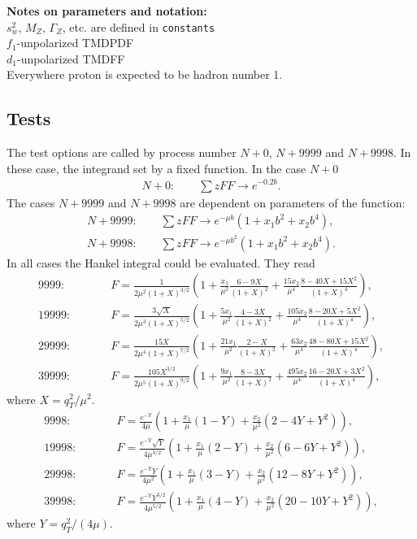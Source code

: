 \documentclass[prd,nofootinbib,eqsecnum,final]{revtex4}
\renewcommand{\(}{\left(}
\renewcommand{\)}{\right)}
\renewcommand{\[}{\left[}
\renewcommand{\]}{\right]}
\begin{document}
\textbf{Notes on parameters and notation:} 
\\
$s_w^2$, $M_Z$, $\Gamma_Z$, etc. are defined in \texttt{constants}
\\
$f_1$-unpolarized TMDPDF
\\
$d_1$-unpolarized TMDFF
\\
Everywhere proton is expected to be hadron number 1.


\subsection{Tests}
\label{TMDF:tests}

The test options are called by process number $N+0$, $N+9999$ and $N+9998$. In these case, the integrand set by a fixed function. In the case $N+0$
\begin{eqnarray}
N+0:\qquad \sum z FF \to e^{-0.2b}.
\end{eqnarray}
The cases $N+9999$ and $N+9998$ are dependent on parameters of the function:
\begin{eqnarray}
N+9999:\qquad \sum z FF \to e^{-\mu b}(1+x_1 b^2+x_2 b^4),
\\
N+9998:\qquad \sum z FF \to e^{-\mu b^2}(1+x_1 b^2+x_2 b^4).
\end{eqnarray}
In all cases the Hankel integral could be evaluated. They read
\begin{eqnarray}
\text{9999}:&\qquad& F=\frac{1}{2\mu^2(1+X)^{3/2}}\(1+\frac{x_1}{\mu^2}\frac{6-9X}{(1+X)^2}+\frac{15x_2}{\mu^4}\frac{8-40X+15 X^2}{(1+X)^4}\),
\\
\text{19999}:&\qquad& F=\frac{3\sqrt{X}}{2\mu^3(1+X)^{5/2}}\(1+\frac{5x_1}{\mu^2}\frac{4-3X}{(1+X)^2}+\frac{105x_2}{\mu^4}\frac{8-20X+5 X^2}{(1+X)^4}\),
\\
\text{29999}:&\qquad& F=\frac{15 X}{2\mu^4(1+X)^{7/2}}\(1+\frac{21x_1}{\mu^2}\frac{2-X}{(1+X)^2}+\frac{63x_2}{\mu^4}\frac{48-80X+15 X^2}{(1+X)^4}\),
\\
\text{39999}:&\qquad& F=\frac{105 X^{3/2}}{2\mu^5(1+X)^{9/2}}\(1+\frac{9x_1}{\mu^2}\frac{8-3X}{(1+X)^2}+\frac{495x_2}{\mu^4}\frac{16-20X+3 X^2}{(1+X)^4}\),
\end{eqnarray}
where $X=q_T^2/\mu^2$.
\begin{eqnarray}
\text{9998}:&\qquad& F=\frac{e^{-Y}}{4\mu}\(1+\frac{x_1}{\mu}(1-Y)+\frac{x_2}{\mu^2}(2-4Y+Y^2)\),
\\
\text{19998}:&\qquad& F=\frac{e^{-Y}\sqrt{Y}}{4\mu^{3/2}}\(1+\frac{x_1}{\mu}(2-Y)+\frac{x_2}{\mu^2}(6-6Y+Y^2)\),
\\
\text{29998}:&\qquad& F=\frac{e^{-Y}Y}{4\mu^2}\(1+\frac{x_1}{\mu}(3-Y)+\frac{x_2}{\mu^2}(12-8Y+Y^2)\),
\\
\text{39998}:&\qquad& F=\frac{e^{-Y}Y^{3/2}}{4\mu^{5/2}}\(1+\frac{x_1}{\mu}(4-Y)+\frac{x_2}{\mu^2}(20-10Y+Y^2)\),
\end{eqnarray}
where $Y=q_T^2/(4\mu)$.
\end{document}
